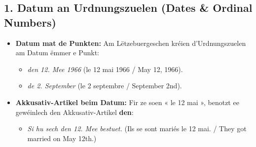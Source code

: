 \subsection*{1. Datum an Urdnungszuelen (Dates \& Ordinal Numbers)}
\begin{itemize}
    \item \textbf{Datum mat de Punkten:} Am Lëtzebuergeschen kréien d'Urdnungszuelen am Datum ëmmer e Punkt:
    \begin{itemize}
        \item \textit{den 12. Mee 1966} (le 12 mai 1966 / May 12, 1966).
        \item \textit{de 2. September} (le 2 septembre / September 2nd).
    \end{itemize}

    \item \textbf{Akkusativ-Artikel beim Datum:} Fir ze soen « le 12 mai », benotzt ee gewéinlech den Akkusativ-Artikel \textbf{den}:
    \begin{itemize}
        \item \textit{Si hu sech den 12. Mee bestuet.} (Ils se sont mariés le 12 mai. / They got married on May 12th.)
    \end{itemize}
\end{itemize}

